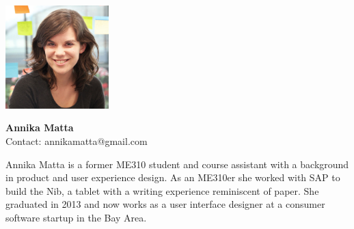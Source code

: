\noindent \includegraphics[width=40mm]{images/annika.jpg}
\parbox[b]{0.6\textwidth}{\textbf{Annika Matta}\\ 
Contact: annikamatta@gmail.com  \\
}

Annika Matta is a former ME310 student and course assistant with a background in product and user experience design. As an ME310er she worked with SAP to build the Nib, a tablet with a writing experience reminiscent of paper. She graduated in 2013 and now works as a user interface designer at a consumer software startup in the Bay Area.
\\ 

